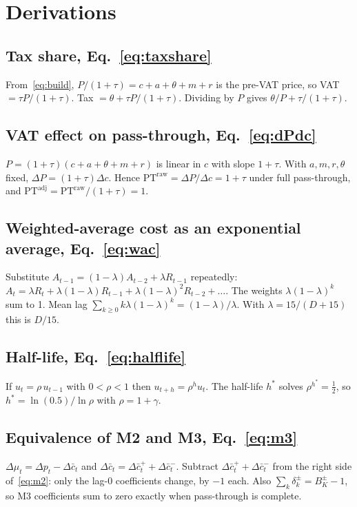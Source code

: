 \documentclass[11pt,a4paper]{article}
\theoremstyle{definition}
\newcommand{\PT}{\mathrm{PT}}
\begin{document}
\section{Derivations}

\subsection{Tax share, Eq.~\eqref{eq:taxshare}}
From~\eqref{eq:build}, $P/(1+\tau)=c+a+\theta+m+r$ is the pre-VAT price, so VAT $=\tau P/(1+\tau)$. Tax $=\theta+\tau P/(1+\tau)$. Dividing by $P$ gives $\theta/P+\tau/(1+\tau)$.

\subsection{VAT effect on pass-through, Eq.~\eqref{eq:dPdc}}
$P=(1+\tau)(c+a+\theta+m+r)$ is linear in $c$ with slope $1+\tau$. With $a,m,r,\theta$ fixed, $\Delta P=(1+\tau)\Delta c$. Hence $\PT^{\text{raw}}=\Delta P/\Delta c=1+\tau$ under full pass-through, and $\PT^{\text{adj}}=\PT^{\text{raw}}/(1+\tau)=1$.

\subsection{Weighted-average cost as an exponential average, Eq.~\eqref{eq:wac}}
Substitute $A_{t-1}=(1-\lambda)A_{t-2}+\lambda R_{t-1}$ repeatedly: $A_t=\lambda R_t+\lambda(1-\lambda)R_{t-1}+\lambda(1-\lambda)^2R_{t-2}+\dots$. The weights $\lambda(1-\lambda)^k$ sum to 1. Mean lag
$\sum_{k\ge0}k\lambda(1-\lambda)^k=(1-\lambda)/\lambda$. With $\lambda=15/(D+15)$ this is $D/15$.

\subsection{Half-life, Eq.~\eqref{eq:halflife}}
If $u_{t}=\rho\,u_{t-1}$ with $0<\rho<1$ then $u_{t+h}=\rho^hu_t$. The half-life $h^\ast$ solves $\rho^{h^\ast}=\tfrac12$, so $h^\ast=\ln(0.5)/\ln\rho$ with $\rho=1+\gamma$.

\subsection{Equivalence of M2 and M3, Eq.~\eqref{eq:m3}}
$\Delta\mu_t=\Delta p_t-\Delta\bar c_t$ and $\Delta\bar c_t=\Delta\bar c^{+}_t+\Delta\bar c^{-}_t$. Subtract $\Delta\bar c^{+}_t+\Delta\bar c^{-}_t$ from the right side of~\eqref{eq:m2}: only the lag-0 coefficients change, by $-1$ each. Also $\sum_k\delta^{\pm}_k=B^{\pm}_K-1$, so M3 coefficients sum to zero exactly when pass-through is complete.
\end{document}
